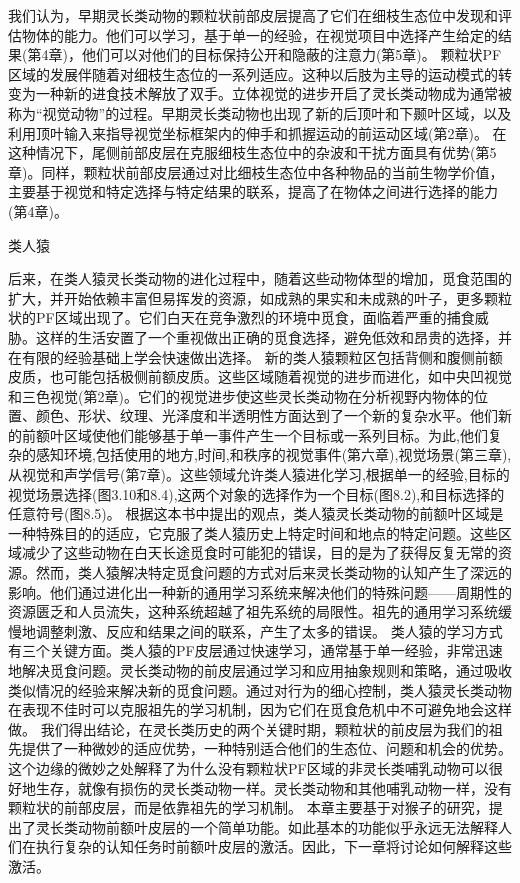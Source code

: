 我们认为，早期灵长类动物的颗粒状前部皮层提高了它们在细枝生态位中发现和评估物体的能力。他们可以学习，基于单一的经验，在视觉项目中选择产生给定的结果(第4章)，他们可以对他们的目标保持公开和隐蔽的注意力(第5章)。
颗粒状PF区域的发展伴随着对细枝生态位的一系列适应。这种以后肢为主导的运动模式的转变为一种新的进食技术解放了双手。立体视觉的进步开启了灵长类动物成为通常被称为“视觉动物”的过程。早期灵长类动物也出现了新的后顶叶和下颞叶区域，以及利用顶叶输入来指导视觉坐标框架内的伸手和抓握运动的前运动区域(第2章)。
在这种情况下，尾侧前部皮层在克服细枝生态位中的杂波和干扰方面具有优势(第5章)。同样，颗粒状前部皮层通过对比细枝生态位中各种物品的当前生物学价值，主要基于视觉和特定选择与特定结果的联系，提高了在物体之间进行选择的能力(第4章)。

类人猿

后来，在类人猿灵长类动物的进化过程中，随着这些动物体型的增加，觅食范围的扩大，并开始依赖丰富但易挥发的资源，如成熟的果实和未成熟的叶子，更多颗粒状的PF区域出现了。它们白天在竞争激烈的环境中觅食，面临着严重的捕食威胁。这样的生活安置了一个重视做出正确的觅食选择，避免低效和昂贵的选择，并在有限的经验基础上学会快速做出选择。
新的类人猿颗粒区包括背侧和腹侧前额皮质，也可能包括极侧前额皮质。这些区域随着视觉的进步而进化，如中央凹视觉和三色视觉(第2章)。它们的视觉进步使这些灵长类动物在分析视野内物体的位置、颜色、形状、纹理、光泽度和半透明性方面达到了一个新的复杂水平。他们新的前额叶区域使他们能够基于单一事件产生一个目标或一系列目标。为此,他们复杂的感知环境,包括使用的地方,时间,和秩序的视觉事件(第六章),视觉场景(第三章),从视觉和声学信号(第7章)。这些领域允许类人猿进化学习,根据单一的经验,目标的视觉场景选择(图3.10和8.4),这两个对象的选择作为一个目标(图8.2),和目标选择的任意符号(图8.5)。
根据这本书中提出的观点，类人猿灵长类动物的前额叶区域是一种特殊目的的适应，它克服了类人猿历史上特定时间和地点的特定问题。这些区域减少了这些动物在白天长途觅食时可能犯的错误，目的是为了获得反复无常的资源。然而，类人猿解决特定觅食问题的方式对后来灵长类动物的认知产生了深远的影响。他们通过进化出一种新的通用学习系统来解决他们的特殊问题——周期性的资源匮乏和人员流失，这种系统超越了祖先系统的局限性。祖先的通用学习系统缓慢地调整刺激、反应和结果之间的联系，产生了太多的错误。
类人猿的学习方式有三个关键方面。类人猿的PF皮层通过快速学习，通常基于单一经验，非常迅速地解决觅食问题。灵长类动物的前皮层通过学习和应用抽象规则和策略，通过吸收类似情况的经验来解决新的觅食问题。通过对行为的细心控制，类人猿灵长类动物在表现不佳时可以克服祖先的学习机制，因为它们在觅食危机中不可避免地会这样做。
我们得出结论，在灵长类历史的两个关键时期，颗粒状的前皮层为我们的祖先提供了一种微妙的适应优势，一种特别适合他们的生态位、问题和机会的优势。这个边缘的微妙之处解释了为什么没有颗粒状PF区域的非灵长类哺乳动物可以很好地生存，就像有损伤的灵长类动物一样。灵长类动物和其他哺乳动物一样，没有颗粒状的前部皮层，而是依靠祖先的学习机制。
本章主要基于对猴子的研究，提出了灵长类动物前额叶皮层的一个简单功能。如此基本的功能似乎永远无法解释人们在执行复杂的认知任务时前额叶皮层的激活。因此，下一章将讨论如何解释这些激活。









